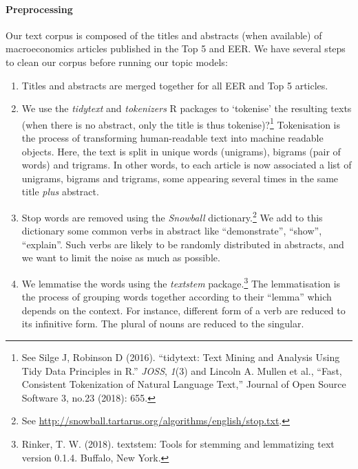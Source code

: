 \documentclass[
  12pt,
  onecolumn]{article}
\providecommand{\tightlist}{%
  \setlength{\itemsep}{0pt}\setlength{\parskip}{0pt}}
\begin{document}
\hypertarget{preprocessing}{%
\paragraph*{Preprocessing}\label{preprocessing}}

Our text corpus is composed of the titles and abstracts (when available)
of macroeconomics articles published in the Top 5 and EER. We have
several steps to clean our corpus before running our topic models:

\begin{enumerate}
\def\labelenumi{\arabic{enumi}.}
\tightlist
\item
  Titles and abstracts are merged together for all EER and Top 5
  articles.
\item
  We use the \emph{tidytext} and \emph{tokenizers} R packages to
  `tokenise' the resulting texts (when there is no abstract, only the
  title is thus tokenise)?\footnote{See Silge J, Robinson D (2016).
    ``tidytext: Text Mining and Analysis Using Tidy Data Principles in
    R.'' \emph{JOSS}, \emph{1}(3) and Lincoln A. Mullen et al., ``Fast,
    Consistent Tokenization of Natural Language Text,'' Journal of Open
    Source Software 3, no.23 (2018): 655.} Tokenisation is the process
  of transforming human-readable text into machine readable objects.
  Here, the text is split in unique words (unigrams), bigrams (pair of
  words) and trigrams. In other words, to each article is now associated
  a list of unigrams, bigrams and trigrams, some appearing several times
  in the same title \emph{plus} abstract.
\item
  Stop words are removed using the \emph{Snowball}
  dictionary.\footnote{See
    \url{http://snowball.tartarus.org/algorithms/english/stop.txt}.} We
  add to this dictionary some common verbs in abstract like
  ``demonstrate'', ``show'', ``explain''. Such verbs are likely to be
  randomly distributed in abstracts, and we want to limit the noise as
  much as possible.
\item
  We lemmatise the words using the \emph{textstem} package.\footnote{Rinker,
    T. W. (2018). textstem: Tools for stemming and lemmatizing text
    version 0.1.4. Buffalo, New York.} The lemmatisation is the process
  of grouping words together according to their ``lemma'' which depends
  on the context. For instance, different form of a verb are reduced to
  its infinitive form. The plural of nouns are reduced to the singular.
\end{enumerate}
\end{document}
